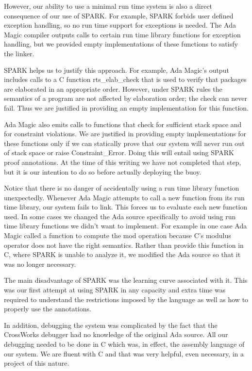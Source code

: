 \documentclass{sig-alternate}
\begin{document}
However, our ability to use a minimal run time system is also a direct consequence of our use of
SPARK. For example, SPARK forbids user defined exception handling, so no run time support for
exceptions is needed. The Ada Magic compiler outputs calls to certain run time library functions
for exception handling, but we provided empty implementations of these functions to satisfy the
linker.

SPARK helps us to justify this approach. For example, Ada Magic's output includes calls to a C
function rts\_\-elab\_check that is used to verify that packages are elaborated in an
appropriate order. However, under SPARK rules the semantics of a program are not affected by
elaboration order; the check can never fail. Thus we are justified in providing an empty
implementation for this function.

Ada Magic also emits calls to functions that check for sufficient stack space and for constraint
violations. We are justified in providing empty implementations for these functions only if we
can statically prove that our system will never run out of stack space or raise
Constraint\_Error. Doing this will entail using SPARK proof annotations. At the time of this
writing we have not completed that step, but it is our intention to do so before actually
deploying the buoy.

Notice that there is no danger of accidentally using a run time library function unexpectedly.
Whenever Ada Magic attempts to call a new function from its run time library, our system fails
to link. This forces us to evaluate each new function used. In some cases we changed the Ada
source specifically to avoid using run time library functions we didn't want to implement. For
example in one case Ada Magic called a function to compute the mod operation because C's modulus
operator does not have the right semantics. Rather than provide this function in C, where SPARK
is unable to analyze it, we modified the Ada source so that it was no longer necessary.

The main disadvantage of SPARK was the learning curve associated with it. This was our first
attempt at using SPARK in any capacity and extra time was required to understand the
restrictions imposed by the language as well as how to properly use the annotations.

In addition, debugging the system was complicated by the fact that the CrossWorks debugger had
no knowledge of the original Ada source. All our debugging needed to be done in C which was, in
effect, the assembly language of our system. We are fluent with C and that was very helpful,
even necessary, in a project of this nature.
\end{document}
